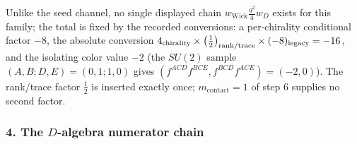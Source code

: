 \begin{remark}%
\label{rem:ss:ad-weightchain}
Unlike the seed channel, no single displayed chain
$w_{\mathrm{Wick}}\frac{g^{2}}{4}w_{D}$ exists for this family; the total is
fixed by the recorded conversions: a per-chirality conditional factor $-8$, the
absolute conversion
$4_{\rm chirality}\times\big(\tfrac12\big)_{\rm rank/trace}\times
(-8)_{\rm legacy}=-16$,
and the isolating color value $-2$ (the $SU(2)$ sample $(A,B;D,E)=(0,1;1,0)$
gives $(f^{ACD}f^{BCE},f^{BCD}f^{ACE})=(-2,0)$). The rank/trace factor
$\tfrac12$ is inserted exactly once; $m_{\mathrm{contact}}=1$ of step 6
supplies no second factor.
\end{remark}

\subsubsection*{4. The $D$-algebra numerator chain}

